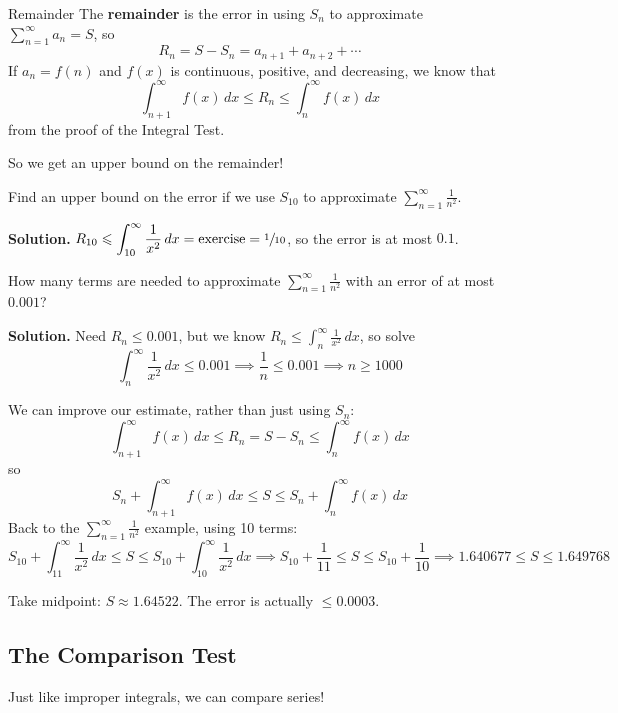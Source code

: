 \begin{Definition}{Remainder}{}
    The \textbf{remainder} is the error in using $ S_n $ to approximate $ \sum\limits_{n=1}^{\infty} a_n=S $,
    so
    \[ R_n=S-S_n=a_{n+1}+a_{n+2}+\cdots \]
    If $ a_n=f(n) $ and $ f(x) $ is continuous, positive, and decreasing, we know that
    \[ \boxed{\int_{n+1}^{\infty} f(x)\, d{x} \leqslant R_n\leqslant \int_{n}^{\infty} f(x)\, d{x}} \]
    from the proof of the Integral Test.
\end{Definition}
So we get an upper bound on the remainder!

\begin{Example}{}{}
    Find an upper bound on the error if we use $ S_{10} $ to approximate
    $ \displaystyle\sum\limits_{n=1}^{\infty} \frac{1}{n^2}  $.

    \textbf{Solution.} $ \displaystyle R_{10}\leqslant \int_{10}^{\infty}\frac{1}{x^2}  \, d{x}=
        \text{exercise}=\sfrac{1}{10} $, so the error is at most $ 0.1 $.
\end{Example}

\begin{Example}{}{}
    How many terms are needed to approximate $ \displaystyle \sum\limits_{n=1}^{\infty} \frac{1}{n^2}  $
    with an error of at most $ 0.001 $?

    \textbf{Solution.} Need $ R_n\leqslant 0.001 $, but we know $
        \displaystyle R_n\leqslant \int_{n}^{\infty}
        \frac{1}{x^2} \, d{x} $, so solve
    \[ \int_{n}^{\infty} \frac{1}{x^2} \, d{x} \leqslant 0.001\implies
        \frac{1}{n} \leqslant 0.001\implies n\geqslant 1000 \]
\end{Example}

We can improve our estimate, rather than just using $ S_n $:
\[ \int_{n+1}^{\infty} f(x)\, d{x} \leqslant R_n=S-S_n\leqslant \int_{n}^{\infty} f(x)\, d{x} \]
so
\[ S_n+\int_{n+1}^{\infty} f(x)\, d{x} \leqslant S\leqslant S_n+\int_{n}^{\infty} f(x)\, d{x} \]
Back to the $ \displaystyle \sum\limits_{n=1}^{\infty} \frac{1}{n^2} $ example, using 10 terms:
\[ S_{10}+\int_{11}^{\infty} \frac{1}{x^2} \, d{x} \leqslant S\leqslant S_{10}+\int_{10}^{\infty}
    \frac{1}{x^2} \, d{x}
    \implies S_{10}+\frac{1}{11} \leqslant S\leqslant S_{10}+\frac{1}{10} \implies
    1.640677\leqslant S\leqslant 1.649768  \]

Take midpoint: $ S\approx 1.64522 $. The error is actually $ \leqslant 0.0003 $.

\subsection*{The Comparison Test}
Just like improper integrals, we can compare series!

